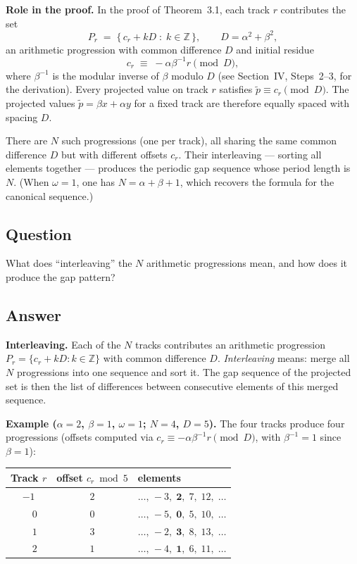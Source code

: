 \documentclass{amsart}
\theoremstyle{definition}
\theoremstyle{plain}
\theoremstyle{remark}
\begin{document}
\noindent\textbf{Role in the proof.}
In the proof of Theorem~3.1, each track \(r\) contributes the set
\[
  P_r \;=\; \bigl\{\, c_r + kD \;:\; k \in \mathbb{Z} \,\bigr\},
  \qquad D = \alpha^2 + \beta^2,
\]
an arithmetic progression with common difference \(D\) and initial residue
\[
  c_r \;\equiv\; -\alpha\beta^{-1}r \pmod{D},
\]
where \(\beta^{-1}\) is the modular inverse of \(\beta\) modulo \(D\)
(see Section~IV, Steps~2--3, for the derivation).
Every projected value on track \(r\) satisfies \(\tilde{p} \equiv c_r \pmod{D}\).  The projected values \(\tilde{p} = \beta x + \alpha y\) for a fixed
track are therefore equally spaced with spacing \(D\).

There are \(N\) such progressions (one per track), all sharing the same
common difference \(D\) but with different offsets \(c_r\).  Their
interleaving --- sorting all elements together --- produces the periodic gap
sequence whose period length is \(N\).  (When \(\omega = 1\), one has
\(N = \alpha + \beta + 1\), which recovers the formula for the canonical
sequence.)

\subsection*{Question}

What does ``interleaving'' the \(N\) arithmetic progressions mean, and
how does it produce the gap pattern?

\subsection*{Answer}

\noindent\textbf{Interleaving.}
Each of the \(N\) tracks contributes an arithmetic progression
\(P_r = \{c_r + kD : k\in\mathbb{Z}\}\) with common difference \(D\).
\emph{Interleaving} means: merge all \(N\) progressions into one sequence
and sort it.  The gap sequence of the projected set is then the list of
differences between consecutive elements of this merged sequence.

\noindent\textbf{Example (\(\alpha=2\), \(\beta=1\), \(\omega=1\);
\(N=4\), \(D=5\)).}
The four tracks produce four progressions (offsets computed via
\(c_r \equiv -\alpha\beta^{-1}r \pmod{D}\), with \(\beta^{-1}=1\) since
\(\beta=1\)):

\begin{center}
\begin{tabular}{ccl}
\hline
Track \(r\) & offset \(c_r \bmod 5\) & elements \\
\hline
\(-1\) & \(2\) & \(\ldots,\,-3,\;\mathbf{2},\;7,\;12,\;\ldots\) \\
\(\phantom{-}0\) & \(0\) & \(\ldots,\,-5,\;\mathbf{0},\;5,\;10,\;\ldots\) \\
\(\phantom{-}1\) & \(3\) & \(\ldots,\,-2,\;\mathbf{3},\;8,\;13,\;\ldots\) \\
\(\phantom{-}2\) & \(1\) & \(\ldots,\,-4,\;\mathbf{1},\;6,\;11,\;\ldots\) \\
\hline
\end{tabular}
\end{center}
\end{document}
